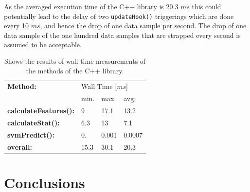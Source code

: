 \documentclass{article}
\begin{document}
As the averaged execution time of the C++ library is 20.3 $ms$ this could potentially lead to the delay of two \texttt{updateHook()} triggerings which are done every 10 $ms$, and hence the drop of one data sample per second. The drop of one data sample of the one hundred data samples that are strapped every second is assumed to be acceptable.


\begin{table}[htb!]
   \centering
    \caption{Shows the results of wall time measurements of the methods of the C++ library.}\label{fig:compmeasurments}
    \begin{tabularx}{\columnwidth}{X|XXX}
    \textbf{Method:} & \multicolumn{3}{X}{Wall Time [$ms$]} \\
    &min.&max.&avg.\\
    \hline
    \hline
\textbf{calculateFeatures():} & 9&  17.1& 13.2 \\
\textbf{calculateStat():}     & 6.3 & 13 & 7.1 \\
\textbf{svmPredict():}        &  0. &  0.001 & 0.0007  \\
\hline
\textbf{overall:}             & 15.3 & 30.1 &20.3  \\
    \end{tabularx}	
\end{table}


\section{Conclusions}


\FloatBarrier



\end{document}
